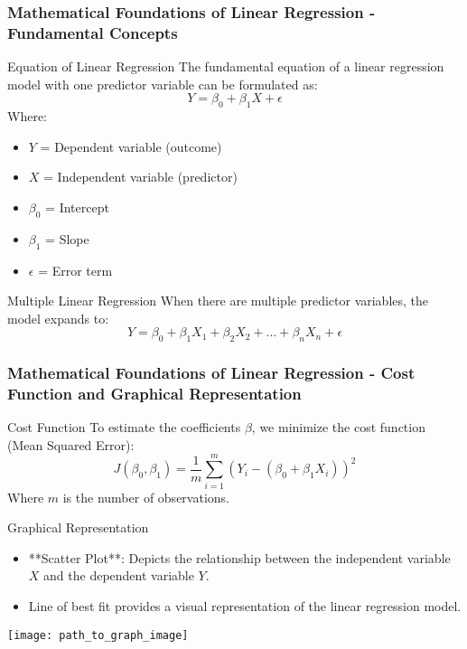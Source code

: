 \documentclass[aspectratio=169]{beamer}
\begin{document}
\begin{frame}[fragile]
    \frametitle{Mathematical Foundations of Linear Regression - Fundamental Concepts}
    \begin{block}{Equation of Linear Regression}
        The fundamental equation of a linear regression model with one predictor variable can be formulated as:
        \begin{equation}
            Y = \beta_0 + \beta_1X + \epsilon
        \end{equation}
        Where:
        \begin{itemize}
            \item \( Y \) = Dependent variable (outcome)
            \item \( X \) = Independent variable (predictor)
            \item \( \beta_0 \) = Intercept
            \item \( \beta_1 \) = Slope
            \item \( \epsilon \) = Error term
        \end{itemize}
    \end{block}

    \begin{block}{Multiple Linear Regression}
        When there are multiple predictor variables, the model expands to:
        \begin{equation}
            Y = \beta_0 + \beta_1X_1 + \beta_2X_2 + ... + \beta_nX_n + \epsilon
        \end{equation}
    \end{block}
\end{frame}

\begin{frame}[fragile]
    \frametitle{Mathematical Foundations of Linear Regression - Cost Function and Graphical Representation}
    \begin{block}{Cost Function}
        To estimate the coefficients \( \beta \), we minimize the cost function (Mean Squared Error):
        \begin{equation}
            J(\beta_0, \beta_1) = \frac{1}{m} \sum_{i=1}^m (Y_i - (\beta_0 + \beta_1X_i))^2
        \end{equation}
        Where \( m \) is the number of observations.
    \end{block}

    \begin{block}{Graphical Representation}
        \begin{itemize}
            \item **Scatter Plot**: Depicts the relationship between the independent variable \( X \) and the dependent variable \( Y \). 
            \item Line of best fit provides a visual representation of the linear regression model.
        \end{itemize}
        \texttt{[image: path\_to\_graph\_image]}
    \end{block}
\end{frame}
\end{document}
